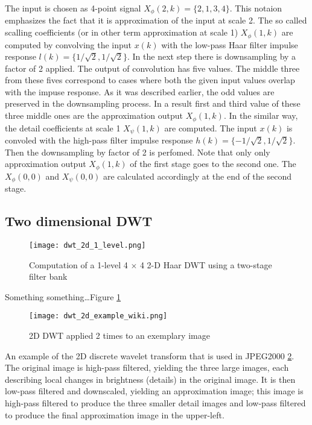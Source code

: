 The input is chosen as 4-point signal $X_{\phi}(2, k) = \{2, 1, 3, 4\}$. This notaion emphasizes the fact
that it is approximation of the input at scale 2. The so called scalling coefficients (or in other term
approximation at scale 1) $X_{\phi}(1, k)$ are computed by convolving the input $x(k)$ with the low-pass
Haar filter impulse response $l(k) = \{1/\sqrt{2}, 1/\sqrt{2}\}$. In the next step there is downsampling
by a factor of 2 applied. The output of convolution has five values. The middle three from these fives 
correspond to cases where both the given input values overlap with the impuse response. As it was described
earlier, the odd values are preserved in the downsampling process. In a result first and third value of these
three middle ones are the approximation output $X_{\phi}(1, k)$. In the similar way, the detail coefficients
at scale 1 $X_{\psi}(1, k)$ are computed. The input $x(k)$ is convoled with the high-pass filter impulse
response $h(k) = \{-1/\sqrt{2}, 1/\sqrt{2}\}$. Then the downsampling by factor of 2 is perfomed.
Note that only only approximation output $X_{\phi}(1, k)$ of the first stage goes to the second one.
The $X_{\phi}(0, 0)$ and $X_{\psi}(0, 0)$ are calculated accordingly at the end of the second stage. \cite{dwt_impl}

\subsection{Two dimensional DWT}

\begin{figure}
    \centering
    \texttt{[image: dwt\_2d\_1\_level.png]}
    \caption{Computation of a 1-level 4 $\times$ 4 2-D Haar DWT using a two-stage filter bank \cite{dwt_impl}}
    \label{fig:dwt_2d_1_level}
\end{figure}

Something something\dots Figure \ref{fig:dwt_2d_1_level} \cite{dwt_impl}

\begin{figure}
    \centering
    \texttt{[image: dwt\_2d\_example\_wiki.png]}
    \caption{2D DWT applied 2 times to an exemplary image \cite{dwt_example_wiki}}
    \label{fig:dwt_2d_example_wiki}
\end{figure}

An example of the 2D discrete wavelet transform that is used in JPEG2000 \ref{fig:dwt_2d_example_wiki}.
The original image is high-pass filtered, yielding the three large images, each describing local changes
in brightness (details) in the original image. It is then low-pass filtered and downscaled, yielding
an approximation image; this image is high-pass filtered to produce the three smaller detail images and low-pass
filtered to produce the final approximation image in the upper-left. \cite{dwt_example_wiki}

